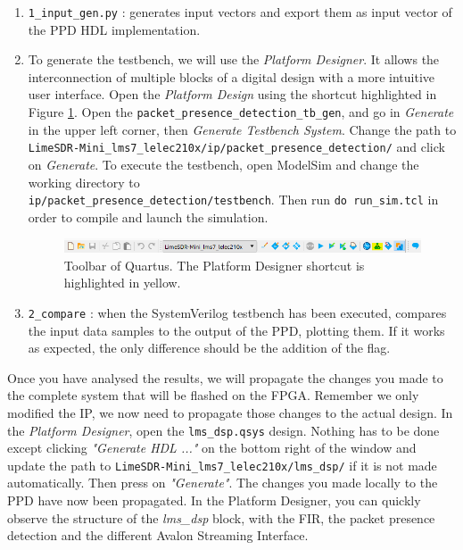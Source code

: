 \begin{enumerate}
\begin{enumerate}
    \item \texttt{1\_input\_gen.py} : generates input vectors and export them as input vector of the PPD HDL implementation.

    \item To generate the testbench, we will use the \textit{Platform Designer}. It allows the interconnection of multiple blocks of a digital design with a more intuitive user interface. Open the \textit{Platform Design} using the shortcut highlighted in Figure \ref{fig:quartus_platform_designer}. Open the \texttt{packet\_presence\_detection\_tb\_gen}, and go in \textit{Generate} in the upper left corner, then \textit{Generate Testbench System}. Change the path to \texttt{LimeSDR-Mini\_lms7\_lelec210x/ip/packet\_presence\_detection/} and click on \textit{Generate}. To execute the testbench, open ModelSim and change the working directory to\\ \texttt{ip/packet\_presence\_detection/testbench}. Then run \texttt{do run\_sim.tcl} in order to compile and launch the simulation.

\begin{figure}[H]
    \centering
    \includegraphics[scale=0.7]{figures/quartus_toolbar.PNG}
    \caption{Toolbar of Quartus. The Platform Designer shortcut is highlighted in yellow.}
    \label{fig:quartus_platform_designer}
\end{figure}

    \item \texttt{2\_compare} : when the SystemVerilog testbench has been executed, compares the input data samples to the output of the PPD, plotting them. If it works as expected, the only difference should be the addition of the flag.
\end{enumerate}

Once you have analysed the results, we will propagate the changes you made to the complete system that will be flashed on the FPGA. Remember we only modified the IP, we now need to propagate those changes to the actual design. In the \textit{Platform Designer}, open the \texttt{lms\_dsp.qsys} design. Nothing has to be done except clicking \textit{"Generate HDL ..."} on the bottom right of the window and update the path to
\texttt{LimeSDR-Mini\_lms7\_lelec210x/lms\_dsp/} if it is not made automatically. Then press on \textit{"Generate"}. The changes you made locally to the PPD have now been propagated. In the Platform Designer, you can quickly observe the structure of the \textit{lms\_dsp} block, with the FIR, the packet presence detection and the different Avalon Streaming Interface.


\end{enumerate}
